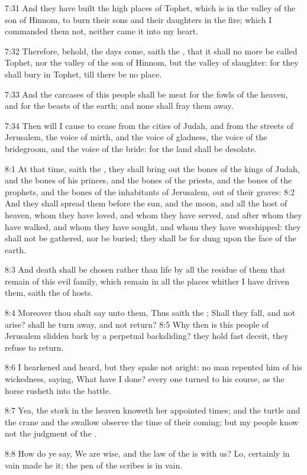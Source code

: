 7:31 And they have built the high places of Tophet, which is in the valley of the son of Hinnom, to burn their sons and their daughters in the fire; which I commanded them not, neither came it into my heart.

7:32 Therefore, behold, the days come, saith the \LORD, that it shall no more be called Tophet, nor the valley of the son of Hinnom, but the valley of slaughter: for they shall bury in Tophet, till there be no place.

7:33 And the carcases of this people shall be meat for the fowls of the heaven, and for the beasts of the earth; and none shall fray them away.

7:34 Then will I cause to cease from the cities of Judah, and from the streets of Jerusalem, the voice of mirth, and the voice of gladness, the voice of the bridegroom, and the voice of the bride: for the land shall be desolate.

8:1 At that time, saith the \LORD, they shall bring out the bones of the kings of Judah, and the bones of his princes, and the bones of the priests, and the bones of the prophets, and the bones of the inhabitants of Jerusalem, out of their graves: 8:2 And they shall spread them before the sun, and the moon, and all the host of heaven, whom they have loved, and whom they have served, and after whom they have walked, and whom they have sought, and whom they have worshipped: they shall not be gathered, nor be buried; they shall be for dung upon the face of the earth.

8:3 And death shall be chosen rather than life by all the residue of them that remain of this evil family, which remain in all the places whither I have driven them, saith the \LORD of hosts.

8:4 Moreover thou shalt say unto them, Thus saith the \LORD; Shall they fall, and not arise? shall he turn away, and not return?  8:5 Why then is this people of Jerusalem slidden back by a perpetual backsliding?  they hold fast deceit, they refuse to return.

8:6 I hearkened and heard, but they spake not aright: no man repented him of his wickedness, saying, What have I done? every one turned to his course, as the horse rusheth into the battle.

8:7 Yea, the stork in the heaven knoweth her appointed times; and the turtle and the crane and the swallow observe the time of their coming; but my people know not the judgment of the \LORD.

8:8 How do ye say, We are wise, and the law of the \LORD is with us?  Lo, certainly in vain made he it; the pen of the scribes is in vain.

